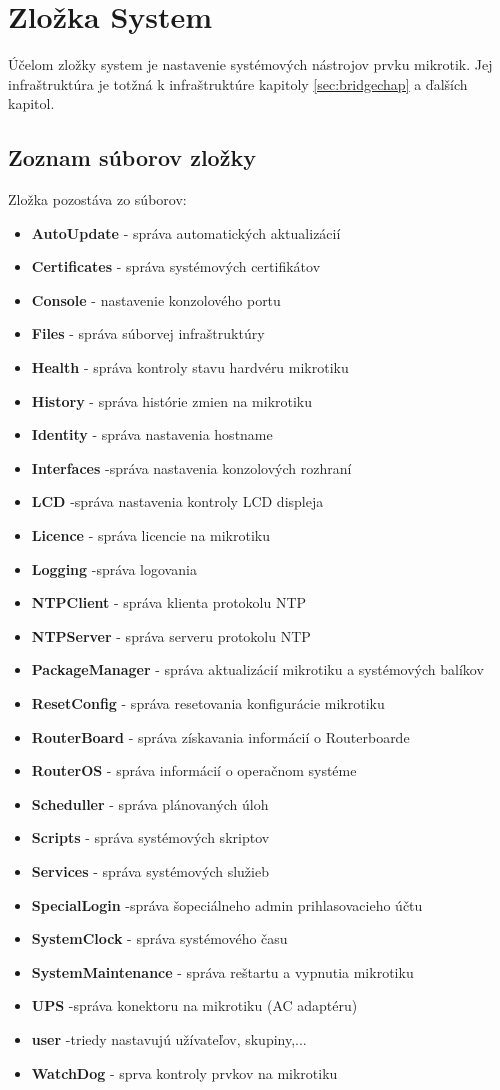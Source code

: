 \section{Zložka System}
Účelom zložky system je nastavenie systémových nástrojov prvku mikrotik. Jej infraštruktúra je totžná k infraštruktúre kapitoly \ref{sec:bridgechap} a ďalších kapitol.
\subsection{Zoznam súborov zložky}
Zložka pozostáva zo súborov:
\begin{itemize}
\item \textbf{AutoUpdate} - správa automatických aktualizácií
\item \textbf{Certificates} - správa systémových certifikátov
\item \textbf{Console} - nastavenie konzolového portu
\item \textbf{Files} - správa súborvej infraštruktúry
\item \textbf{Health} - správa kontroly stavu hardvéru mikrotiku
\item \textbf{History} - správa histórie zmien na mikrotiku
\item \textbf{Identity} - správa nastavenia hostname
\item \textbf{Interfaces} -správa nastavenia konzolových rozhraní
\item \textbf{LCD} -správa nastavenia kontroly LCD displeja
\item \textbf{Licence} - správa licencie na mikrotiku
\item \textbf{Logging} -správa logovania 
\item \textbf{NTPClient} - správa klienta protokolu NTP
\item \textbf{NTPServer} - správa serveru protokolu NTP
\item \textbf{PackageManager} - správa aktualizácií mikrotiku a systémových balíkov
\item \textbf{ResetConfig} - správa resetovania konfigurácie mikrotiku
\item \textbf{RouterBoard} - správa získavania informácií o Routerboarde
\item \textbf{RouterOS} - správa informácií o operačnom systéme
\item \textbf{Scheduller} - správa plánovaných úloh
\item \textbf{Scripts} - správa systémových skriptov
\item \textbf{Services} - správa systémových služieb
\item \textbf{SpecialLogin} -správa šopeciálneho admin prihlasovacieho účtu
\item \textbf{SystemClock} - správa systémového času
\item \textbf{SystemMaintenance} - správa reštartu a vypnutia mikrotiku
\item \textbf{UPS} -správa konektoru na mikrotiku (AC adaptéru)
\item \textbf{user} -triedy nastavujú užívateľov, skupiny,...
\item \textbf{WatchDog} - sprva kontroly prvkov na mikrotiku
\end{itemize}
